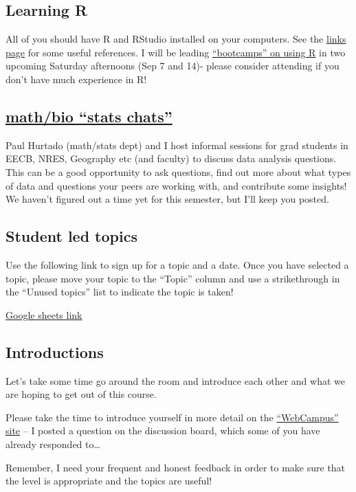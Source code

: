 \documentclass[
]{article}
\begin{document}
\hypertarget{learning-r}{%
\subsection{Learning R}\label{learning-r}}

All of you should have R and RStudio installed on your computers. See
the \href{https://kevintshoemaker.github.io/NRES-746/}{links page} for
some useful references. I will be leading
\href{http://naes.unr.edu/shoemaker/teaching/R-Bootcamp/index.html}{``bootcamps''
on using R} in two upcoming Saturday afternoons (Sep 7 and 14)- please
consider attending if you don't have much experience in R!

\hypertarget{mathbio-stats-chats}{%
\subsection{\texorpdfstring{\href{https://kevintshoemaker.github.io/StatsChats/}{math/bio
``stats chats''}}{math/bio ``stats chats''}}\label{mathbio-stats-chats}}

Paul Hurtado (math/stats dept) and I host informal sessions for grad
students in EECB, NRES, Geography etc (and faculty) to discuss data
analysis questions. This can be a good opportunity to ask questions,
find out more about what types of data and questions your peers are
working with, and contribute some insights! We haven't figured out a
time yet for this semester, but I'll keep you posted.

\hypertarget{student-led-topics}{%
\subsection{Student led topics}\label{student-led-topics}}

Use the following link to sign up for a topic and a date. Once you have
selected a topic, please move your topic to the ``Topic'' column and use
a strikethrough in the ``Unused topics'' list to indicate the topic is
taken!

\href{https://docs.google.com/spreadsheets/d/1aZa31yLtxN5_El95SrbqXFT5eDgm0EmtrJmNcY2jEKA/edit?usp=sharing}{Google
sheets link}

\hypertarget{introductions}{%
\subsection{Introductions}\label{introductions}}

Let's take some time go around the room and introduce each other and
what we are hoping to get out of this course.

Please take the time to introduce yourself in more detail on the
\href{https://unr.canvaslms.com/courses/45665}{``WebCampus'' site} -- I
posted a question on the discussion board, which some of you have
already responded to\ldots{}

Remember, I need your frequent and honest feedback in order to make sure
that the level is appropriate and the topics are useful!
\end{document}
